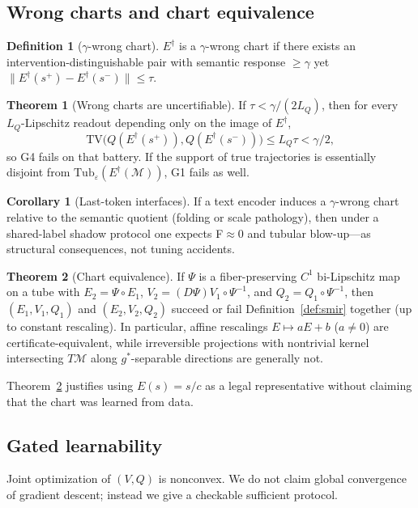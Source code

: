 \documentclass[letterpaper,10pt,twocolumn]{article}
\theoremstyle{definition}
\newtheorem{definition}{Definition}
\newtheorem{theorem}{Theorem}
\newtheorem{corollary}{Corollary}
\newcommand{\Tub}{\mathrm{Tub}}
\newcommand{\TV}{\mathrm{TV}}
\newcommand{\cM}{\mathcal{M}}
\begin{document}
\subsection{Wrong charts and chart equivalence}
\begin{definition}[$\gamma$-wrong chart]
\label{def:wrong}
$E^\dagger$ is a $\gamma$-wrong chart if there exists an intervention-distinguishable pair with semantic response $\ge\gamma$ yet $\|E^\dagger(s^+)-E^\dagger(s^-)\|\le\tau$.
\end{definition}

\begin{theorem}[Wrong charts are uncertifiable]
\label{thm:wrong}
If $\tau<\gamma/(2L_Q)$, then for every $L_Q$-Lipschitz readout depending only on the image of $E^\dagger$,
\[
\TV\big(Q(E^\dagger(s^+)),Q(E^\dagger(s^-))\big)
\le L_Q\tau
<\gamma/2,
\]
so G4 fails on that battery.
If the support of true trajectories is essentially disjoint from $\Tub_\varepsilon(E^\dagger(\cM))$, G1 fails as well.
\end{theorem}

\begin{corollary}[Last-token interfaces]
\label{cor:text}
If a text encoder induces a $\gamma$-wrong chart relative to the semantic quotient (folding or scale pathology), then under a shared-label shadow protocol one expects F$\approx 0$ and tubular blow-up---as structural consequences, not tuning accidents.
\end{corollary}

\begin{theorem}[Chart equivalence]
\label{thm:equiv}
If $\Psi$ is a fiber-preserving $C^1$ bi-Lipschitz map on a tube with $E_2=\Psi\circ E_1$, $V_2=(D\Psi)V_1\circ\Psi^{-1}$, and $Q_2=Q_1\circ\Psi^{-1}$, then $(E_1,V_1,Q_1)$ and $(E_2,V_2,Q_2)$ succeed or fail Definition~\ref{def:smir} together (up to constant rescaling).
In particular, affine rescalings $E\mapsto aE+b$ ($a\neq 0$) are certificate-equivalent, while irreversible projections with nontrivial kernel intersecting $T\cM$ along $g^*$-separable directions are generally not.
\end{theorem}
Theorem~\ref{thm:equiv} justifies using $E(s)=s/c$ as a legal representative without claiming that the chart was learned from data.

\subsection{Gated learnability}
Joint optimization of $(V,Q)$ is nonconvex.
We do not claim global convergence of gradient descent; instead we give a checkable sufficient protocol.
\end{document}
